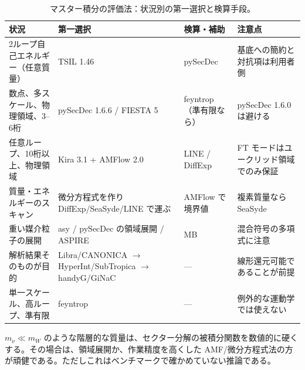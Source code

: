 \documentclass[a4paper,10pt]{ltjsarticle}
\begin{document}
\begin{table}[tbp]
\centering\small
\caption{マスター積分の評価法：状況別の第一選択と検算手段。}
\label{tab:integrals}
\begin{tabularx}{\linewidth}{>{\raggedright\arraybackslash\hsize=1.18\hsize}X>{\raggedright\arraybackslash\hsize=1.18\hsize}X>{\raggedright\arraybackslash\hsize=0.49\hsize}X>{\raggedright\arraybackslash\hsize=1.15\hsize}X}
\toprule
\textbf{状況} & \textbf{第一選択} & \textbf{検算・補助} & \textbf{注意点} \\
\midrule
2ループ自己エネルギー（任意質量） & TSIL 1.46 & pySecDec & 基底への簡約と対抗項は利用者側 \\
数点、多スケール、物理領域、3--6桁 & pySecDec 1.6.6 / FIESTA 5 & feyntrop（準有限なら） & pySecDec 1.6.0 は避ける \\
任意ループ、10桁以上、物理領域 & Kira 3.1 + AMFlow 2.0 & LINE / DiffExp & FT モードはユークリッド領域でのみ保証 \\
質量・エネルギーのスキャン & 微分方程式を作り DiffExp/SeaSyde/LINE で運ぶ & AMFlow で境界値 & 複素質量なら SeaSyde \\
重い媒介粒子の展開 & asy / pySecDec の領域展開 / ASPIRE & MB & 混合符号の多項式に注意 \\
解析結果そのものが目的 & Libra/CANONICA $\to$ HyperInt/SubTropica $\to$ handyG/GiNaC & --- & 線形還元可能であることが前提 \\
単一スケール、高ループ、準有限 & feyntrop & --- & 例外的な運動学では使えない \\
\bottomrule
\end{tabularx}
\end{table}

$m_\nu \ll m_W$ のような階層的な質量は、セクター分解の被積分関数を数値的に硬くする。その場合は、領域展開か、作業精度を高くした AMF/微分方程式法の方が頑健である。ただしこれはベンチマークで確かめていない推論である。
\end{document}
